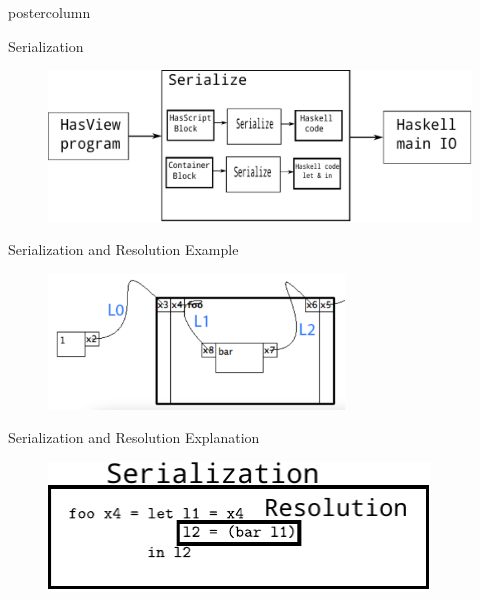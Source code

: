 \documentclass[final]{beamer}
\begin{document}
\begin{frame}[fragile]
\begin{columns}[T]
\begin{column}{.3\textwidth}
\begin{beamercolorbox}[wd=\textwidth]{postercolumn}
\begin{block}{Serialization}
                    \begin{figure}
                        \includegraphics[width=1\textwidth]{serialize.pdf}
                    \end{figure}
                \end{block}

                        


                \begin{block}{Serialization and Resolution Example}
                    \begin{figure}
                        \includegraphics[width=0.7\textwidth]{resolution-raw.pdf}
                    \end{figure}
                \end{block}
                \begin{block}{Serialization and Resolution Explanation}
                    \begin{figure}
                        \includegraphics[width=0.9\textwidth]{resolution.pdf}
                    \end{figure}
                \end{block}


\end{beamercolorbox}
\end{column}
\end{columns}
\end{frame}
\end{document}
